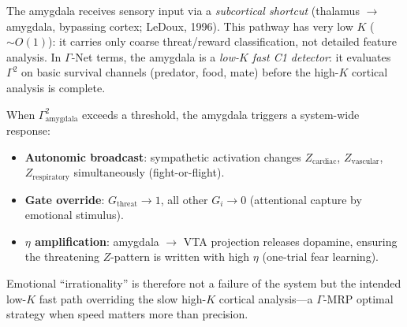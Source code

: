 \documentclass[aps,pre,twocolumn,superscriptaddress,floatfix]{revtex4-2}
\begin{document}
\begin{remark}
\label{rem:emotion}
The amygdala receives sensory input via a
\emph{subcortical shortcut} (thalamus $\to$ amygdala,
bypassing cortex; LeDoux, 1996).
This pathway has very low $K$ ($\sim O(1)$): it carries
only coarse threat/reward classification, not detailed
feature analysis.
In $\Gamma$-Net terms, the amygdala is a
\emph{low-$K$ fast C1 detector}: it evaluates $\Gamma^2$
on basic survival channels (predator, food, mate)
before the high-$K$ cortical analysis is complete.

When $\Gamma^2_{\text{amygdala}}$ exceeds a threshold,
the amygdala triggers a system-wide response:
\begin{itemize}
  \item \textbf{Autonomic broadcast}:
    sympathetic activation changes $Z_{\text{cardiac}}$,
    $Z_{\text{vascular}}$, $Z_{\text{respiratory}}$
    simultaneously (fight-or-flight).
  \item \textbf{Gate override}:
    $G_{\text{threat}} \to 1$, all other $G_i \to 0$
    (attentional capture by emotional stimulus).
  \item \textbf{$\eta$ amplification}:
    amygdala $\to$ VTA projection releases dopamine,
    ensuring the threatening $Z$-pattern is written
    with high $\eta$ (one-trial fear learning).
\end{itemize}
Emotional ``irrationality'' is therefore not a failure
of the system but the intended low-$K$ fast path
overriding the slow high-$K$ cortical analysis---a
$\Gamma$-MRP optimal strategy when speed matters more
than precision.
\end{remark}
\end{document}
